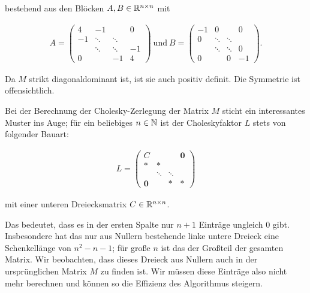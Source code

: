 bestehend aus den Blöcken $A,B \in \mathbb{R}^{n \times n}$ mit

\begin{align*}
    A = \left( \begin{array}{cccccc}
                4 & -1 && 0 \\
                -1 & \ddots & \ddots & \\
                & \ddots & \ddots & -1 \\
                0 && -1 & 4
         \end{array}
        \right)
\mathrm{~und~}
    B = \left(\begin{array}{cccccc}
                -1 & 0 && 0 \\
                0 & \ddots & \ddots & \\
                & \ddots & \ddots & 0 \\
                0 && 0 & -1
          \end{array}
        \right).
 \end{align*}

Da $M$ strikt diagonaldominant ist, ist sie auch positiv definit. Die Symmetrie ist offensichtlich.

Bei der Berechnung der Cholesky-Zerlegung der Matrix $M$ sticht ein interessantes Muster ins Auge; für ein beliebiges $n \in \mathbb{N}$ ist der Choleskyfaktor $L$ stets von folgender Bauart:

\begin{align*}
    L = \left(\begin{array}{cccccc}
                C &&& \boldsymbol{0} \\
                \ast & \ast && \\
                & \ddots & \ddots & \\
                \boldsymbol{0} && \ast & \ast
           \end{array}
     \right)
\end{align*}

mit einer unteren Dreiecksmatrix $C \in \mathbb{R}^{n \times n}$.

Das bedeutet, dass es in der ersten Spalte nur $n+1$ Einträge ungleich 0 gibt. Insbesondere hat das nur aus Nullern bestehende linke untere Dreieck eine Schenkellänge von $n^{2}-n-1$; für große $n$ ist das der Großteil der gesamten Matrix. Wir beobachten, dass dieses Dreieck aus Nullern auch in der ursprünglichen Matrix $M$ zu finden ist. Wir müssen diese Einträge also nicht mehr berechnen und können so die Effizienz des Algorithmus steigern.

